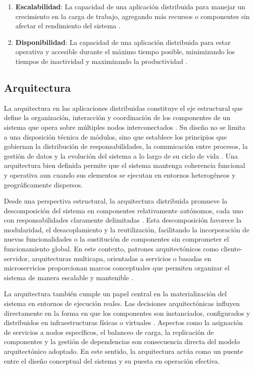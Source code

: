 \begin{enumerate}
	\item \textbf{Escalabilidad}: 
	La capacidad de una aplicación distribuida para manejar un crecimiento en la carga de trabajo, agregando más recursos o componentes sin afectar el rendimiento del sistema \cite{Priyeshkumar2019scalable}.
	
	\item \textbf{Disponibilidad}: 
	La capacidad de una aplicación distribuida para estar operativa y accesible durante el máximo tiempo posible, minimizando los tiempos de inactividad y maximizando la productividad \cite{Melo2021distributed}.
\end{enumerate}

			\subsection{Arquitectura}
				\noindent
				La arquitectura en las aplicaciones distribuidas constituye el eje estructural que define la organización, interacción y coordinación de los componentes de un sistema que opera sobre múltiples nodos interconectados \cite{Tanenbaum2023Distributed,Coulouris2011Distributed}. Su diseño no se limita a una disposición técnica de módulos, sino que establece los principios que gobiernan la distribución de responsabilidades, la comunicación entre procesos, la gestión de datos y la evolución del sistema a lo largo de su ciclo de vida \cite{Kleppmann2022Designing}. Una arquitectura bien definida permite que el sistema mantenga coherencia funcional y operativa aun cuando sus elementos se ejecutan en entornos heterogéneos y geográficamente dispersos.
				
				Desde una perspectiva estructural, la arquitectura distribuida promueve la descomposición del sistema en componentes relativamente autónomos, cada uno con responsabilidades claramente delimitadas \cite{Newman2021Microservices}. Esta descomposición favorece la modularidad, el desacoplamiento y la reutilización, facilitando la incorporación de nuevas funcionalidades o la sustitución de componentes sin comprometer el funcionamiento global. En este contexto, patrones arquitectónicos como cliente-servidor, arquitecturas multicapa, orientadas a servicios o basadas en microservicios proporcionan marcos conceptuales que permiten organizar el sistema de manera escalable y mantenible \cite{Coulouris2011Distributed}.
				
				La arquitectura también cumple un papel central en la materialización del sistema en entornos de ejecución reales. Las decisiones arquitectónicas influyen directamente en la forma en que los componentes son instanciados, configurados y distribuidos en infraestructuras físicas o virtuales \cite{Tanenbaum2023Distributed}. Aspectos como la asignación de servicios a nodos específicos, el balanceo de carga, la replicación de componentes y la gestión de dependencias son consecuencia directa del modelo arquitectónico adoptado. En este sentido, la arquitectura actúa como un puente entre el diseño conceptual del sistema y su puesta en operación efectiva.
				
